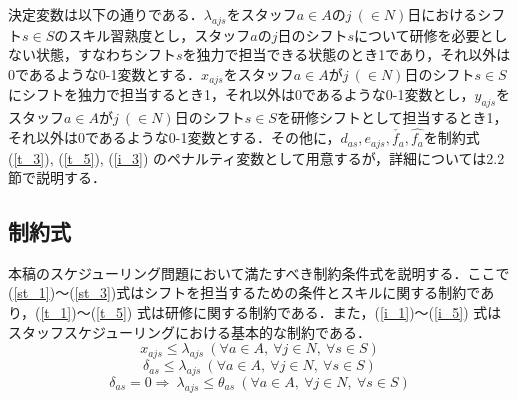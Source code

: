 \documentclass[11pt]{jsarticle}
\begin{document}
決定変数は以下の通りである．$\lambda_{ajs}$をスタッフ$a \in A$の$j \ (\in N)$日におけるシフト$s \in S$のスキル習熟度とし，スタッフ$a$の$j$日のシフト$s$について研修を必要としない状態，すなわちシフト$s$を独力で担当できる状態のとき1であり，それ以外は0であるような0-1変数とする．$x_{ajs}$をスタッフ$a \in A$が$j \ (\in N)$日のシフト$s \in S$にシフトを独力で担当するとき1，それ以外は0であるような0-1変数とし，$y_{ajs}$をスタッフ$a \in A$が$j \ (\in N)$日のシフト$s \in S$を研修シフトとして担当するとき1，それ以外は0であるような0-1変数とする．その他に，$d_{as}, e_{ajs}, \check{f_a}, \hat{f_a} $を制約式 (\ref{t_3}), (\ref{t_5}), (\ref{i_3}) のペナルティ変数として用意するが，詳細については2.2節で説明する．

\vspace{\baselineskip}
\subsection{制約式}
本稿のスケジューリング問題において満たすべき制約条件式を説明する．ここで(\ref{st_1})～(\ref{st_3})式はシフトを担当するための条件とスキルに関する制約であり，(\ref{t_1})～(\ref{t_5}) 式は研修に関する制約である．また，(\ref{i_1})～(\ref{i_5}) 式はスタッフスケジューリングにおける基本的な制約である．
\begin{equation}
x_{ajs} \leq \lambda_{ajs} \ (\forall a \in A , \ \forall j \in N, \ \forall s \in S)
\label{st_1}
\end{equation}
\begin{equation}
\delta_{as} \leq \lambda_{ajs} \ (\forall a \in A, \ \forall j \in N, \ \forall s \in S)
\label{st_2}
\end{equation}
\begin{equation}
\delta_{as} = 0 \Rightarrow \ \lambda_{ajs} \leq \theta_{as} \ (\forall a \in A, \ \forall j \in N, \ \forall s \in S)
\label{st_3}
\end{equation}
\end{document}
